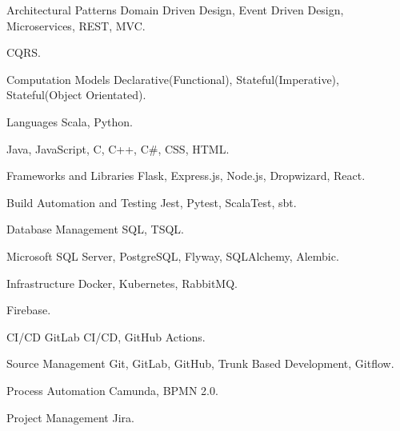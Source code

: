   \begin{cvskills}
    \cvskill
      {Architectural Patterns}
      { Domain Driven Design, Event Driven Design, Microservices, REST, MVC.}

    \cvskill
      {}
      { CQRS.}

    \cvskill
      {Computation Models}
      { Declarative(Functional), Stateful(Imperative), Stateful(Object Orientated).}

    \cvskill
      {Languages}
      { Scala, Python.}

    \cvskill
      {}
      { Java, JavaScript, C, C++, C\#, CSS, HTML.}

    \cvskill
      {Frameworks and Libraries}
      { Flask, Express.js, Node.js, Dropwizard, React.}

    \cvskill
      {Build Automation and Testing}
      { Jest, Pytest, ScalaTest, sbt.}

    \cvskill
      {Database Management}
      { SQL, TSQL.}

    \cvskill
      {}
      { Microsoft SQL Server, PostgreSQL, Flyway, SQLAlchemy, Alembic.}

    \cvskill
      {Infrastructure}
      { Docker, Kubernetes, RabbitMQ.}

    \cvskill
      {}
      { Firebase.}

    \cvskill
      {CI/CD}
      { GitLab CI/CD, GitHub Actions.}

    \cvskill
      {Source Management}
      { Git, GitLab, GitHub, Trunk Based Development, Gitflow.}

    \cvskill
      {Process Automation}
      { Camunda, BPMN 2.0.}

    \cvskill
      {Project Management}
      { Jira.}
  \end{cvskills}
